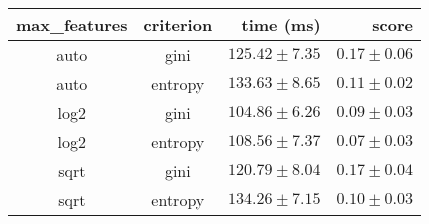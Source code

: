 \begin{tabular}{ccrr}
\toprule
\textbf{max\_features} & \textbf{criterion} & \textbf{time (ms)} & \textbf{score}\\
\midrule
auto & gini & $125.42 \pm 7.35$ & $0.17 \pm 0.06$\\
auto & entropy & $133.63 \pm 8.65$ & $0.11 \pm 0.02$\\
log2 & gini & $104.86 \pm 6.26$ & $0.09 \pm 0.03$\\
log2 & entropy & $108.56 \pm 7.37$ & $0.07 \pm 0.03$\\
sqrt & gini & $120.79 \pm 8.04$ & $0.17 \pm 0.04$\\
sqrt & entropy & $134.26 \pm 7.15$ & $0.10 \pm 0.03$\\
\bottomrule
\end{tabular}
